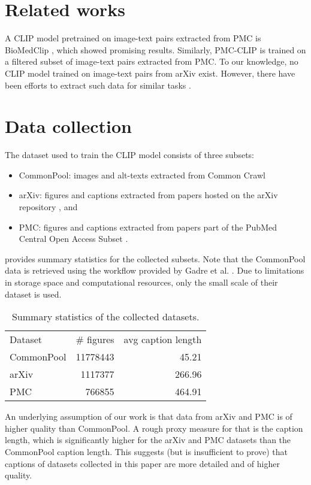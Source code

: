 \section{Related works}
A CLIP model pretrained on image-text pairs extracted from PMC is BioMedClip \cite{DBLP:journals/corr/abs-2303-00915}, which showed promising results. Similarly, PMC-CLIP \cite{lin2023pmcclip} is trained on a filtered subset of image-text pairs extracted from PMC. To our knowledge, no CLIP model trained on image-text pairs from arXiv exist. However, there have been efforts to extract such data for similar tasks \cite{DBLP:conf/jcdl/SiegelLPA18}.

\section{Data collection}

The dataset used to train the CLIP model consists of three subsets:

\begin{itemize}
	\item CommonPool: images and alt-texts extracted from Common Crawl \cite{commoncrawl}
	\item arXiv: figures and captions extracted from papers hosted on the arXiv repository \cite{arxiv}, and
	\item PMC: figures and captions extracted from papers part of the PubMed Central Open Access Subset \cite{pmcoas}.
\end{itemize}

 provides summary statistics for the collected subsets. Note that the CommonPool data is retrieved using the workflow provided by Gadre et al. \cite{DBLP:journals/corr/abs-2304-14108}. Due to limitations in storage space and computational resources, only the small scale of their dataset is used.

\begin{table}
	\begin{tabular}{l r r}
		Dataset & \# figures & avg caption length \\
		CommonPool & 11778443 & 45.21 \\
		arXiv & 1117377 & 266.96 \\
		PMC & 766855 & 464.91 \\
	\end{tabular}
	\caption{Summary statistics of the collected datasets.}
	\label{tab:data.stats}
\end{table}

An underlying assumption of our work is that data from arXiv and PMC is of higher quality than CommonPool. A rough proxy measure for that is the caption length, which is significantly higher for the arXiv and PMC datasets than the CommonPool caption length. This suggests (but is insufficient to prove) that captions of datasets collected in this paper are more detailed and of higher quality.

